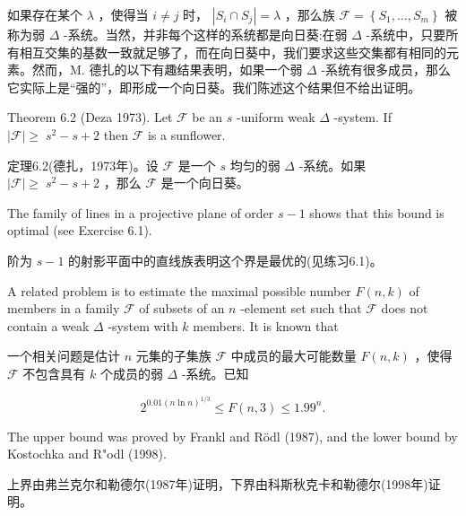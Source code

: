 \documentclass[10pt]{article}
\begin{document}
\begin{tcolorbox}\relax
如果存在某个 \(\lambda\) ，使得当 \(i \neq  j\) 时， \(\left| {{S}_{i} \cap  {S}_{j}}\right|  = \lambda\) ，那么族 \(\mathcal{F} = \left\{  {{S}_{1},\ldots ,{S}_{m}}\right\}\) 被称为弱 \(\Delta\) -系统。当然，并非每个这样的系统都是向日葵:在弱 \(\Delta\) -系统中，只要所有相互交集的基数一致就足够了，而在向日葵中，我们要求这些交集都有相同的元素。然而，M. 德扎的以下有趣结果表明，如果一个弱 \(\Delta\) -系统有很多成员，那么它实际上是“强的”，即形成一个向日葵。我们陈述这个结果但不给出证明。
\end{tcolorbox}

Theorem 6.2 (Deza 1973). Let \(\mathcal{F}\) be an \(s\) -uniform weak \(\Delta\) -system. If \(\left| \mathcal{F}\right|  \geq \; {s}^{2} - s + 2\) then \(\mathcal{F}\) is a sunflower.

\begin{tcolorbox}\relax
定理6.2(德扎，1973年)。设 \(\mathcal{F}\) 是一个 \(s\) 均匀的弱 \(\Delta\) -系统。如果 \(\left| \mathcal{F}\right|  \geq \; {s}^{2} - s + 2\) ，那么 \(\mathcal{F}\) 是一个向日葵。
\end{tcolorbox}

The family of lines in a projective plane of order \(s - 1\) shows that this bound is optimal (see Exercise 6.1).

\begin{tcolorbox}\relax
阶为 \(s - 1\) 的射影平面中的直线族表明这个界是最优的(见练习6.1)。
\end{tcolorbox}

A related problem is to estimate the maximal possible number \(F\left( {n,k}\right)\) of members in a family \(\mathcal{F}\) of subsets of an \(n\) -element set such that \(\mathcal{F}\) does not contain a weak \(\Delta\) -system with \(k\) members. It is known that

\begin{tcolorbox}\relax
一个相关问题是估计 \(n\) 元集的子集族 \(\mathcal{F}\) 中成员的最大可能数量 \(F\left( {n,k}\right)\) ，使得 \(\mathcal{F}\) 不包含具有 \(k\) 个成员的弱 \(\Delta\) -系统。已知
\end{tcolorbox}

\[
{2}^{{0.01}{\left( n\ln n\right) }^{1/3}} \leq  F\left( {n,3}\right)  \leq  {1.99}^{n}.
\]

The upper bound was proved by Frankl and Rödl (1987), and the lower bound by Kostochka and R"odl (1998).

\begin{tcolorbox}\relax
上界由弗兰克尔和勒德尔(1987年)证明，下界由科斯秋克卡和勒德尔(1998年)证明。
\end{tcolorbox}
\end{document}
